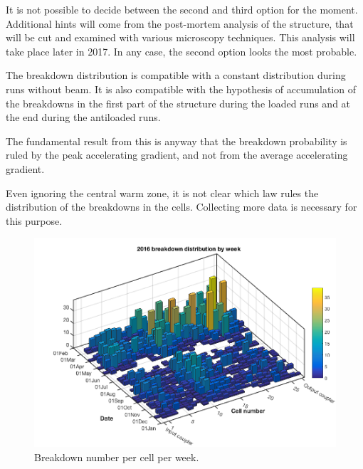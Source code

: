 It is not possible to decide between the second and third option for the moment. Additional hints will come from the post-mortem analysis of the structure, that will be cut and examined with various microscopy techniques. This analysis will take place later in 2017. In any case, the second option looks the most probable. 

The breakdown distribution is compatible with a constant distribution during runs without beam. It is also compatible with the hypothesis of accumulation of the breakdowns in  the first part of the structure during the loaded runs and at the end during the antiloaded runs.

The fundamental result from this is anyway that the breakdown probability is ruled by the peak accelerating gradient, and not from the average accelerating gradient.


Even ignoring the central warm zone, it is not clear which law rules the distribution of the breakdowns in the cells. Collecting more data is necessary for this purpose.

\begin{figure}[h]
\centering 
\includegraphics[scale=0.4]{pictures/week_distr_3D.png}
\caption{Breakdown number per cell per week. }
\label{BD_3d}
\end{figure}



